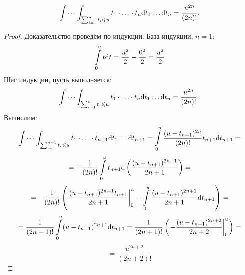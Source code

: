 \begin{lemma}
$$
    \idotsint_{ \sum_{i=1}^{n} t_i \leq u} {
        t_1 \cdot \ldots \cdot t_{n}
        \mathrm{d} t_1 \ldots \mathrm{d} t_{n}
    } =
    \frac {u ^ {2n}} {(2n)!}
    \label{subint1}.
$$
\end{lemma}
\begin{proof}
Доказательство проведём по индукции. База индукции, $n = 1$:
$$
    \intop_0^u {t \mathrm{d} t} =
    \frac {u ^ 2} 2 - \frac {0 ^ 2} 2 =
    \frac {u ^ 2} 2
$$
Шаг индукции, пусть выполняется:
$$
    \idotsint_{ \sum_{i=1}^{n} t_i \leq u} {
        t_1 \cdot \ldots \cdot t_{n}
        \mathrm{d} t_1 \ldots \mathrm{d} t_{n}
    } =
    \frac {u ^ {2n}} {(2n)!} \, .%
$$
Вычислим:
$$
    \idotsint_{ \sum_{i=1}^{n+1} t_i \leq u} {
        t_1 \cdot \ldots \cdot t_{n+1}
        \mathrm{d} t_1 \ldots \mathrm{d} t_{n+1}
    } =
    \intop_{0}^{u}
    \frac {(u - t_{n+1})^{2n}} {(2n)!} t_{n+1}
    \mathrm{d} t_{n+1}
    = $$ $$ =
    - \frac 1 {(2n)!}
    \intop_{0}^{u}
    t_{n+1} \mathrm{d} \left(\frac {(u - t_{n+1})^{2n + 1}} {2n + 1}\right)
    = $$ $$ =
    - \frac 1 {(2n)!}
    \left( \left.
        \frac {(u - t_{n+1})^{2n + 1} t_{n+1}} {2n + 1} \right|_0^u
        - \intop_{0}^{u}
        \frac {(u - t_{n+1}) ^ {2n+1}} {2n+1}
        \mathrm{d} t_{n+1}
    \right)
    = $$ $$ =
    \frac 1 {(2n + 1)!}
    \intop_{0}^{u}
    (u - t_{n+1}) ^ {2n+1}
    \mathrm{d} t_{n+1}
    =
    \frac 1 {(2n + 1)!}
    \left( \left.
        - \frac
        {(u - t_{n+1}) ^ {2n+2}}
        {2n + 2}
        \right|_0^u
    \right)
    = $$ $$ =
    \frac {u ^ {2n+2}} {(2n + 2)!}
$$
\end{proof}

